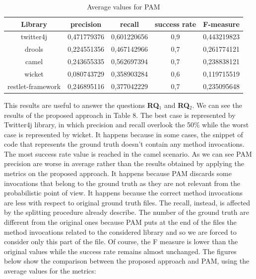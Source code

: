  
 \begin{table}[!h]
  \caption{ Average values for PAM}
  \label{Table:4}
 \begin{center}
\begin{tabular}{|c|c|c|c|c|}
\hline
 \textbf{Library} & \textbf{precision}  & \textbf{recall} & \textbf{success rate} & \textbf{F-measure} \\ 
\hline
 twitter4j & 0,471779376  & 0,601220656 & 0,9  & 0,443219823  \\
\hline
drools & 0,224551356 & 0,467142966   & 0,7 & 0,261774121 \\
\hline
camel & 0,243655335  & 0,562697394 & 0,7 & 0,238838121 \\
\hline 
wicket &0,080743729  & 0,358903284 &  0,6 & 0,119715519  \\
\hline
restlet-framework & 0,246895116  & 0,377042229 & 0,7 & 0,235095648 \\
\hline
\end{tabular}
\end{center}
\end{table} 
This results are useful to answer the questions \textbf{RQ$_1$} and \textbf{RQ$_2$}. We can see the results of the proposed approach in Table 8. The best case is represented by Twitter4j library, in which precision and recall overlook the 50\% while the worst case is represented by wicket. It happens because in some cases, the snippet of code that represents the ground truth doesn't contain any method invocations. The most success rate value is reached in the camel scenario.
As we can see PAM precision are worse in average rather than the results obtained by applying the metrics on the proposed approach. It happens because PAM discards some invocations that belong to the ground truth as they are not relevant from the probabilistic point of view. It happens because the correct method invocations are less with respect to original ground truth files. The recall, instead, is affected by the splitting procedure already describe. The number of the ground truth are different from the original ones because PAM puts at the end of the files the method invocations related to the considered library and so we are forced to consider only this part of the file. Of course, the F measure is lower than the original values while the success rate remains almost unchanged. The figures below show the comparison between the proposed approach and PAM, using the average values for the metrics:\\

